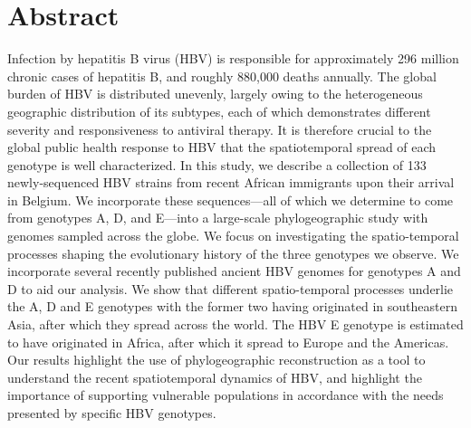 \section{Abstract}
Infection by hepatitis B virus (HBV) is responsible for approximately 296 million chronic cases of hepatitis B, and roughly 880,000 deaths annually.
The global burden of HBV is distributed unevenly, largely owing to the heterogeneous geographic distribution of its subtypes, each of which demonstrates different severity and responsiveness to antiviral therapy.
It is therefore crucial to the global public health response to HBV that the spatiotemporal spread of each genotype is well characterized.
In this study, we describe a collection of 133 newly-sequenced HBV strains from recent African immigrants upon their arrival in Belgium.
We incorporate these sequences---all of which we determine to come from genotypes A, D, and E---into a large-scale phylogeographic study with genomes sampled across the globe.
We focus on investigating the spatio-temporal processes shaping the evolutionary history of the three genotypes we observe.
We incorporate several recently published ancient HBV genomes for genotypes A and D to aid our analysis.
We show that different spatio-temporal processes underlie the A, D and E genotypes with the former two having originated in southeastern Asia, after which they spread across the world.
The HBV E genotype is estimated to have originated in Africa, after which it spread to Europe and the Americas.
Our results highlight the use of phylogeographic reconstruction as a tool to understand the recent spatiotemporal dynamics of HBV, and highlight the importance of supporting vulnerable populations in accordance with the needs presented by specific HBV genotypes.

